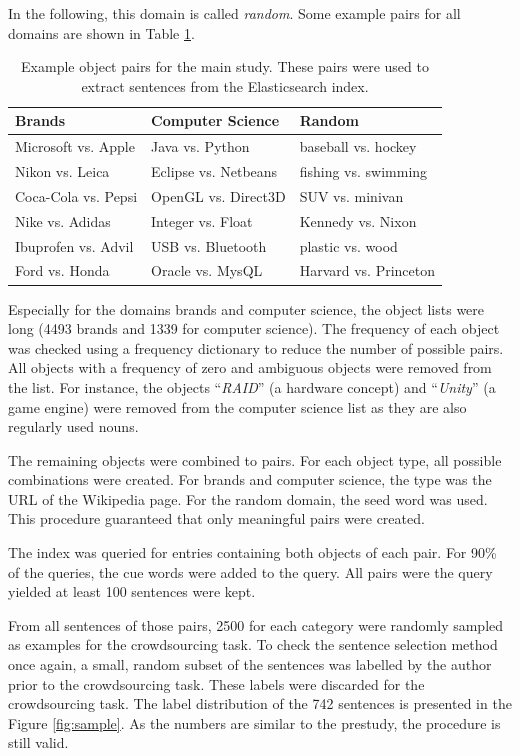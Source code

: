 In the following, this domain is called \emph{random}. Some example pairs for all domains are shown in Table \ref{tbl:exp_pairs}.
\begin{table}[htbp]
\centering
\caption{Example object pairs for the main study. These pairs were used to extract sentences from the Elasticsearch index.}
\label{tbl:exp_pairs}

\begin{tabularx}{\textwidth}{XXX}
\toprule
Brands & Computer Science & Random \\
\midrule
Microsoft vs. Apple & Java vs. Python & baseball vs. hockey \\
Nikon vs. Leica & Eclipse vs. Netbeans & fishing vs. swimming\\
Coca-Cola vs. Pepsi & OpenGL vs. Direct3D & SUV vs. minivan\\
Nike vs. Adidas & Integer vs. Float & Kennedy vs. Nixon\\
Ibuprofen vs. Advil & USB vs. Bluetooth & plastic vs. wood\\
Ford vs. Honda & Oracle vs. MysQL & Harvard vs. Princeton\\

\bottomrule

\end{tabularx}

\end{table}

Especially for the domains brands and computer science, the object lists were long (4493 brands and 1339 for computer science). The frequency of each object was checked using a frequency dictionary to reduce the number of possible pairs. All objects with a frequency of zero and ambiguous objects were removed from the list. For instance, the objects \enquote{\emph{RAID}} (a hardware concept) and \enquote{\emph{Unity}}  (a game engine) were removed from the computer science list as they are also regularly used nouns.

The remaining objects were combined to pairs. For each object type, all possible combinations were created. For brands and computer science, the type was the URL of the Wikipedia page. For the random domain, the seed word was used. This procedure guaranteed that only meaningful pairs were created.

The index was queried for entries containing both objects of each pair. For 90\% of the queries, the cue words were added to the query. All pairs were the query yielded at least 100 sentences were kept.

From all sentences of those pairs, 2500 for each category were randomly sampled as examples for the crowdsourcing task. To check the sentence selection method once again, a small, random subset of the sentences was labelled by the author prior to the crowdsourcing task. These labels were discarded for the crowdsourcing task.
The label distribution of the 742 sentences is presented in the Figure \ref{fig:sample}. As the numbers are similar to the prestudy, the procedure is still valid.



